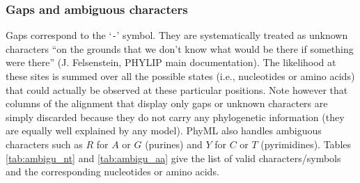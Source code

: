 \documentclass[a4paper,12pt]{article}
\newcommand{\x}[1]{\texttt{#1}}
\begin{document}
\subsubsection{Gaps and ambiguous characters}

Gaps correspond to  the `\x{-}' symbol.  They are systematically treated  as unknown characters ``on
the grounds  that we  don't know what  would be  there if something  were there''  (J.  Felsenstein,
PHYLIP main documentation).   The likelihood at these  sites is summed over all  the possible states
(i.e.,  nucleotides  or   amino  acids)  that  could  actually  be   observed  at  these  particular
positions. Note however that  columns of the alignment that display only  gaps or unknown characters
are simply discarded because  they do not carry any phylogenetic information  (they are equally well
explained  by any  model).  PhyML  also handles  ambiguous characters  such as  $R$ for  $A$  or $G$
(purines) and $Y$ for $C$  or $T$ (pyrimidines).  Tables \ref{tab:ambigu_nt} and \ref{tab:ambigu_aa}
give the list of valid characters/symbols and the corresponding nucleotides or amino acids.
\end{document}
